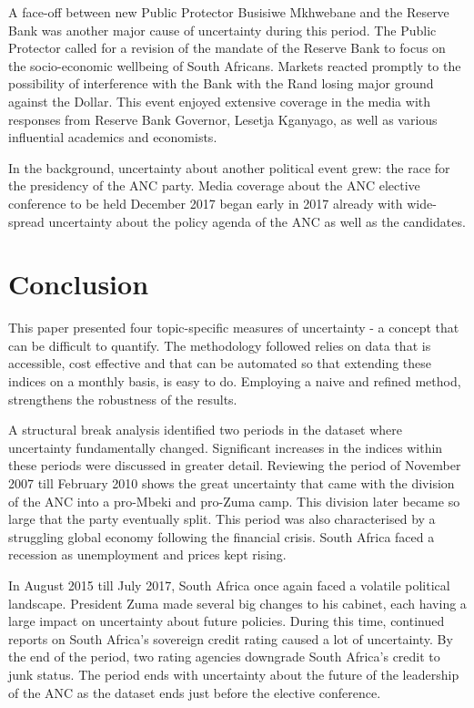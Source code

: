 \documentclass[11pt,preprint, authoryear]{elsarticle}
\numberwithin{equation}{section}
\numberwithin{figure}{section}
\numberwithin{table}{section}
\begin{document}
A face-off between new Public Protector Busisiwe Mkhwebane and the
Reserve Bank was another major cause of uncertainty during this period.
The Public Protector called for a revision of the mandate of the Reserve
Bank to focus on the socio-economic wellbeing of South Africans. Markets
reacted promptly to the possibility of interference with the Bank with
the Rand losing major ground against the Dollar. This event enjoyed
extensive coverage in the media with responses from Reserve Bank
Governor, Lesetja Kganyago, as well as various influential academics and
economists.

In the background, uncertainty about another political event grew: the
race for the presidency of the ANC party. Media coverage about the ANC
elective conference to be held December 2017 began early in 2017 already
with wide-spread uncertainty about the policy agenda of the ANC as well
as the candidates.

\section{\texorpdfstring{Conclusion
\label{sec_conclude}}{Conclusion }}\label{conclusion}
This paper presented four topic-specific measures of uncertainty - a concept that can be difficult to quantify. The methodology followed relies on data that is accessible, cost effective and that can be automated so that extending these indices on a monthly basis, is easy to do. Employing a naive and refined method, strengthens the robustness of the results. 

A structural break analysis identified two periods in the dataset where uncertainty fundamentally changed. Significant increases in the indices within these periods were discussed in greater detail. Reviewing the period of November 2007 till February 2010 shows the great uncertainty that came with the division of the ANC into a pro-Mbeki and pro-Zuma camp. This division later became so large that the party eventually split. This period was also characterised by a struggling global economy following the financial crisis. South Africa faced a recession as unemployment and prices kept rising. 

In August 2015 till July 2017, South Africa once again faced a volatile political landscape. President Zuma made several big changes to his cabinet, each having a large impact on uncertainty about future policies. During this time, continued reports on South Africa's sovereign credit rating caused a lot of uncertainty. By the end of the period, two rating agencies downgrade South Africa's credit to junk status. The period ends with uncertainty about the future of the leadership of the ANC as the dataset ends just before the elective conference. 
\end{document}
